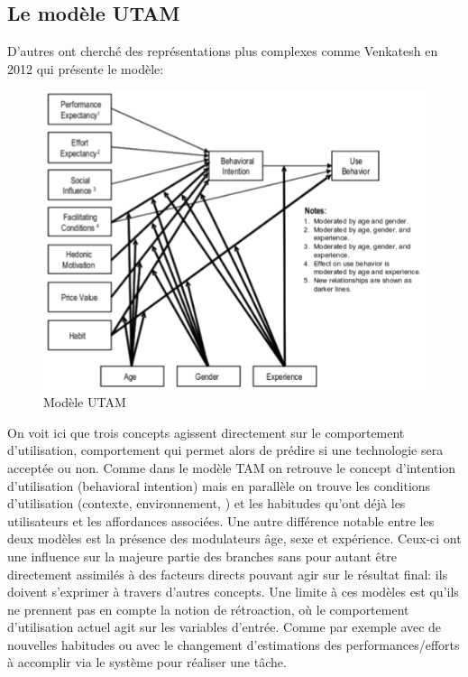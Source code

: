     \subsection{Le modèle UTAM}    
        D'autres ont cherché des représentations plus complexes comme Venkatesh en 2012 qui présente le modèle:
        \begin{figure}[!h]
              \centering
              \label{fig:UTamModel}\includegraphics[width=\linewidth]{Figures/venkatesh-UTAM_Model.png}
              \caption{Modèle UTAM~}
        \end{figure}\par%
        On voit ici que trois concepts agissent directement sur le comportement d'utilisation, comportement qui permet alors de prédire si une technologie sera acceptée ou non. Comme dans le modèle TAM on retrouve le concept d'intention d'utilisation (behavioral intention) mais en parallèle on trouve les conditions d'utilisation (contexte, environnement, \etc) et les habitudes qu'ont déjà les utilisateurs et les affordances associées. 
        Une autre différence notable entre les deux modèles est la présence des modulateurs âge, sexe et expérience. Ceux-ci ont une influence sur la majeure partie des branches sans pour autant être directement assimilés à des facteurs directs pouvant agir sur le résultat final: ils doivent s'exprimer à travers d'autres concepts.
        Une limite à ces modèles est qu'ils ne prennent pas en compte la notion de rétroaction, où le comportement d'utilisation actuel agit sur les variables d'entrée. Comme par exemple avec de nouvelles habitudes ou avec le changement d'estimations des performances/efforts à accomplir via le système pour réaliser une tâche.